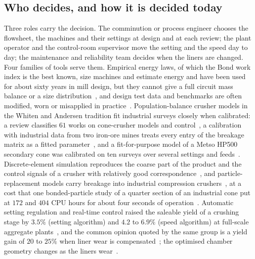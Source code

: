 \subsection{Who decides, and how it is decided today}\label{sec:intro-roles}

Three roles carry the decision. The comminution or process engineer chooses the flowsheet, the machines and their
settings at design and at each review; the plant operator and the control-room supervisor move the setting and the speed
day to day; the maintenance and reliability team decides when the liners are changed. Four families of tools serve them.
Empirical energy laws, of which the Bond work index is the best known, size machines and estimate energy and have been
used for about sixty years in mill design, but they cannot give a full circuit mass balance or a size
distribution~\cite{lacerda2016}, and design test data and benchmarks are often modified, worn or misapplied in
practice~\cite{bailey2009}. Population-balance crusher models in the Whiten and Andersen tradition fit industrial
surveys closely when calibrated: a review classifies $61$ works on cone-crusher models and control~\cite{yamashita2021},
a calibration with industrial data from two iron-ore mines treats every entry of the breakage matrix as a fitted
parameter~\cite{duarte2021}, and a fit-for-purpose model of a Metso HP500 secondary cone was calibrated on ten surveys
over several settings and feeds~\cite{rocha2024}. Discrete-element simulation reproduces the coarse part of the product
and the control signals of a crusher with relatively good correspondence~\cite{quist2016,johansson2017}, and particle-replacement
models carry breakage into industrial compression crushers~\cite{cleary2015,delaney2015}, at a cost that one bonded-particle
study of a quarter section of an industrial cone put at $172$ and $404$ CPU hours for about four seconds of
operation~\cite{quist2012}. Automatic setting regulation and real-time
control raised the saleable yield of a crushing stage by $3.5\%$ (setting algorithm) and $4.2$ to $6.9\%$ (speed
algorithm) at full-scale aggregate plants~\cite{hulthen2010}, and the common opinion quoted by the same group is a yield
gain of $20$ to $25\%$ when liner wear is compensated~\cite{evertsson2015}; the optimised chamber geometry changes as the
liners wear~\cite{lindqvist2003}.

